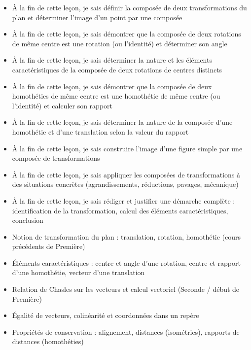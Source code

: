 \documentclass[11pt]{article}
\begin{document}
\begin{objectifs}
\begin{itemize}
\item À la fin de cette leçon, je sais définir la composée de deux transformations du plan et déterminer l'image d'un point par une composée
\item À la fin de cette leçon, je sais démontrer que la composée de deux rotations de même centre est une rotation (ou l'identité) et déterminer son angle
\item À la fin de cette leçon, je sais déterminer la nature et les éléments caractéristiques de la composée de deux rotations de centres distincts
\item À la fin de cette leçon, je sais démontrer que la composée de deux homothéties de même centre est une homothétie de même centre (ou l'identité) et calculer son rapport
\item À la fin de cette leçon, je sais déterminer la nature de la composée d'une homothétie et d'une translation selon la valeur du rapport
\item À la fin de cette leçon, je sais construire l'image d'une figure simple par une composée de transformations
\item À la fin de cette leçon, je sais appliquer les composées de transformations à des situations concrètes (agrandissements, réductions, pavages, mécanique)
\item À la fin de cette leçon, je sais rédiger et justifier une démarche complète : identification de la transformation, calcul des éléments caractéristiques, conclusion
\end{itemize}
\end{objectifs}

\begin{prerequis}
\begin{itemize}
\item Notion de transformation du plan : translation, rotation, homothétie (cours précédents de Première)
\item Éléments caractéristiques : centre et angle d'une rotation, centre et rapport d'une homothétie, vecteur d'une translation
\item Relation de Chasles sur les vecteurs et calcul vectoriel (Seconde / début de Première)
\item Égalité de vecteurs, colinéarité et coordonnées dans un repère
\item Propriétés de conservation : alignement, distances (isométries), rapports de distances (homothéties)
\end{itemize}
\end{prerequis}
\end{document}
